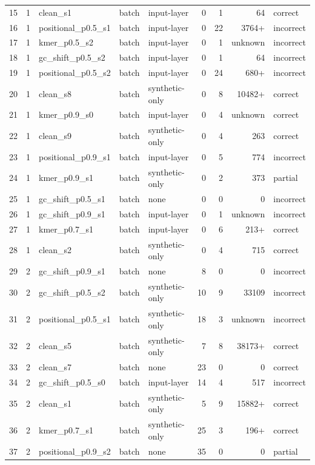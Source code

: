 \begin{longtable}{rrlllrrrl}
15 & 1 & clean\_s1 & batch & input-layer & 0 & 1 & 64 & correct \\
16 & 1 & positional\_p0.5\_s1 & batch & input-layer & 0 & 22 & 3764+ & incorrect \\
17 & 1 & kmer\_p0.5\_s2 & batch & input-layer & 0 & 1 & unknown & incorrect \\
18 & 1 & gc\_shift\_p0.5\_s2 & batch & input-layer & 0 & 1 & 64 & incorrect \\
19 & 1 & positional\_p0.5\_s2 & batch & input-layer & 0 & 24 & 680+ & incorrect \\
20 & 1 & clean\_s8 & batch & synthetic-only & 0 & 8 & 10482+ & correct \\
21 & 1 & kmer\_p0.9\_s0 & batch & input-layer & 0 & 4 & unknown & correct \\
22 & 1 & clean\_s9 & batch & synthetic-only & 0 & 4 & 263 & correct \\
23 & 1 & positional\_p0.9\_s1 & batch & input-layer & 0 & 5 & 774 & incorrect \\
24 & 1 & kmer\_p0.9\_s1 & batch & synthetic-only & 0 & 2 & 373 & partial \\
25 & 1 & gc\_shift\_p0.5\_s1 & batch & none & 0 & 0 & 0 & incorrect \\
26 & 1 & gc\_shift\_p0.9\_s1 & batch & input-layer & 0 & 1 & unknown & incorrect \\
27 & 1 & kmer\_p0.7\_s1 & batch & input-layer & 0 & 6 & 213+ & correct \\
28 & 1 & clean\_s2 & batch & synthetic-only & 0 & 4 & 715 & correct \\
29 & 2 & gc\_shift\_p0.9\_s1 & batch & none & 8 & 0 & 0 & incorrect \\
30 & 2 & gc\_shift\_p0.5\_s2 & batch & synthetic-only & 10 & 9 & 33109 & incorrect \\
31 & 2 & positional\_p0.5\_s1 & batch & synthetic-only & 18 & 3 & unknown & incorrect \\
32 & 2 & clean\_s5 & batch & synthetic-only & 7 & 8 & 38173+ & correct \\
33 & 2 & clean\_s7 & batch & none & 23 & 0 & 0 & correct \\
34 & 2 & gc\_shift\_p0.5\_s0 & batch & input-layer & 14 & 4 & 517 & incorrect \\
35 & 2 & clean\_s1 & batch & synthetic-only & 5 & 9 & 15882+ & correct \\
36 & 2 & kmer\_p0.7\_s1 & batch & synthetic-only & 25 & 3 & 196+ & correct \\
37 & 2 & positional\_p0.9\_s2 & batch & none & 35 & 0 & 0 & partial \\

\end{longtable}

